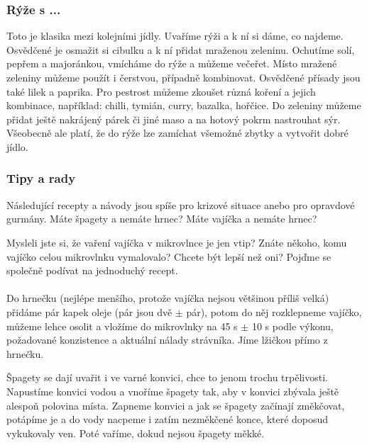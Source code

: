 \subsubsection*{Rýže s ...}
Toto je klasika mezi kolejními jídly. Uvaříme rýži a k ní si dáme, co najdeme.
Osvědčené je osmažit si cibulku a k ní přidat mraženou zeleninu. Ochutíme solí,
pepřem a majoránkou, vmícháme do rýže a můžeme večeřet. Místo mražené zeleniny
můžeme použít i čerstvou, případně kombinovat. Osvědčené přísady jsou také lilek
a paprika. Pro pestrost můžeme zkoušet různá koření a jejich kombinace,
například: chilli, tymián, curry, bazalka, hořčice. Do zeleniny můžeme přidat
ještě nakrájený párek či jiné maso a na hotový pokrm nastrouhat sýr. Všeobecně
ale platí, že do rýže lze zamíchat všemožné zbytky a vytvořit dobré jídlo.


\subsubsection*{Tipy a rady}
Následující recepty a návody jsou spíše pro krizové situace anebo pro opravdové
gurmány. Máte špagety a nemáte hrnec? Máte vajíčka a nemáte hrnec?


Mysleli jste si, že vaření vajíčka v mikrovlnce je jen vtip? Znáte někoho, komu
vajíčko celou mikrovlnku vymalovalo? Chcete být lepší než oni? Pojďme se
společně podívat na jednoduchý recept.
\\\\
Do hrnečku (nejlépe menšího, protože vajíčka nejsou většinou příliš velká)
přidáme pár kapek oleje (pár jsou dvě $\pm$ pár), potom do něj rozklepneme
vajíčko, můžeme lehce osolit a vložíme do mikrovlnky na 45 s $\pm$ 10 s podle
výkonu, požadované konzistence a aktuální nálady strávníka. Jíme lžičkou přímo z
hrnečku.


Špagety se dají uvařit i ve varné konvici, chce to jenom trochu trpělivosti.
Napustíme konvici vodou a vnoříme špagety tak, aby v konvici zbývala ještě
alespoň polovina místa. Zapneme konvici a jak se špagety začínají změkčovat,
potápíme je a do vody nacpeme i zatím nezměkčené konce, které doposud vykukovaly
ven. Poté vaříme, dokud nejsou špagety měkké.


